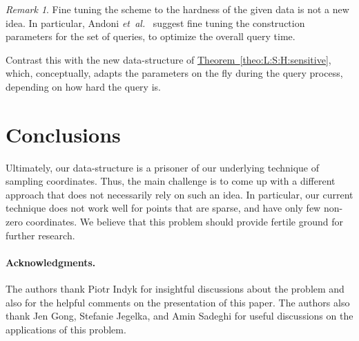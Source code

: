 \documentclass[12pt]{article}\usepackage[cm]{fullpage}
\newcommand{\etal}{\textit{et~al.}\xspace}
\theoremstyle{remark}\theoremheaderfont{\sf}\theorembodyfont{\upshape}\newtheorem{defn}[theorem]{Definition}
\newtheorem{remark}[theorem]{Remark}\newtheorem{example}[theorem]{Example}\newtheorem*{remark:unnumbered}[theorem]{Remark}
\numberwithin{figure}{section}\numberwithin{table}{section}\numberwithin{equation}{section}
\newcommand{\HLink}[2]{\hyperref[#2]{#1~\ref*{#2}}}
\newcommand{\remlab}[1]{\label{rem:#1}}
\newcommand{\thmref}[1]{\HLink{Theorem}{theo:#1}}
\newcommand{\si}[1]{#1}\newcommand{\IntRange}[1]{\left\llbracket #1 \right\rrbracket}
\begin{document}
\begin{remark}
    \remlab{f:tune}Fine tuning the \LSH scheme to the hardness of the given data is
    not a new idea. In particular, Andoni \etal~\cite[Section
    4.3.1]{adiim-lshus-06} suggest fine tuning the \LSH construction
    parameters for the set of queries, to optimize the overall query
    time.

    Contrast this with the new data-structure of
    \thmref{L:S:H:sensitive}, which, conceptually, adapts the
    parameters on the fly during the query process, depending on how
    hard the query is.
\end{remark}







\section{Conclusions}

Ultimately, our data-structure is a prisoner of our underlying
technique of sampling coordinates. Thus, the main challenge is to come
up with a different approach that does not necessarily rely on such an
idea. In particular, our current technique does not work well for
points that are sparse, and have only few non-zero coordinates. We
believe that this problem should provide fertile ground for further
research.

\paragraph{Acknowledgments.}
The authors thank Piotr Indyk for insightful discussions about the
problem and also for the helpful comments on the presentation of this
paper.  The authors also thank \si{Jen} Gong, Stefanie Jegelka, and
Amin Sadeghi for useful discussions on the applications of this
problem.
\end{document}
